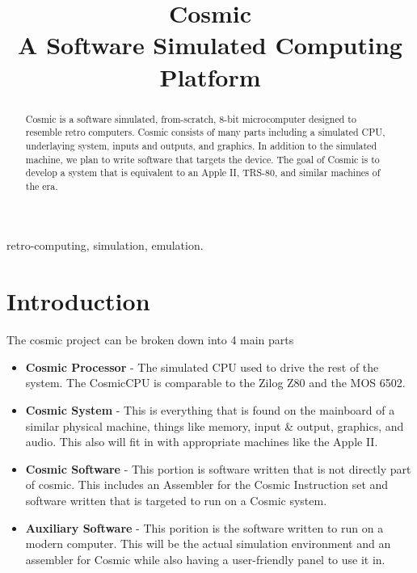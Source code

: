 \documentclass[conference]{IEEEtran}
\begin{document}
\title{
 Cosmic\\A Software Simulated  Computing Platform}

\author{
\and
{}

}

\maketitle

\begin{abstract}
Cosmic is a software simulated, from-scratch, 8-bit microcomputer designed to resemble retro computers. Cosmic consists of many parts including a simulated CPU, underlaying system, inputs and outputs, and graphics. In addition to the simulated machine, we plan to write software that targets the device. The goal of Cosmic is to develop a system that is equivalent to an Apple II, TRS-80, and similar machines of the era.
\end{abstract}

\begin{IEEEkeywords}
retro-computing, simulation, emulation.
\end{IEEEkeywords}

\section{Introduction}
The cosmic project can be broken down into 4 main parts
\begin{itemize}
	\item \textbf{Cosmic Processor} - The simulated CPU used to drive the rest of the system. The CosmicCPU is comparable to the Zilog Z80 and the MOS 6502.
	\item \textbf{Cosmic System} - This is everything that is found on the mainboard of a similar  physical machine, things like memory, input \& output, graphics, and audio. This also will fit in with appropriate machines like the Apple II.
	\item \textbf{Cosmic Software}  - This portion is software written that is not directly part of cosmic. This includes an Assembler for the Cosmic Instruction set and software written that is targeted to run on a Cosmic system.
	\item \textbf{Auxiliary Software} - This porition is the software written to run on a modern computer. This will be the actual simulation environment and an assembler for Cosmic while also having a user-friendly panel to use it in.
\end{itemize}
\end{document}
